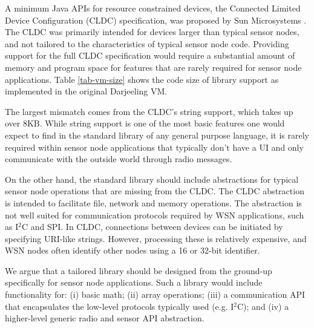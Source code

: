 A minimum Java APIs for resource constrained devices, the Connected Limited Device Configuration (CLDC) specification, was proposed by Sun Microsystems \cite{CLDC}. The CLDC was primarily intended for devices larger than typical sensor nodes, and not tailored to the characteristics of typical sensor node code. Providing support for the full CLDC specification would require a substantial amount of memory and program space for features that are rarely required for sensor node applications. Table \ref{tab-vm-size} shows the code size of library support as implemented in the original Darjeeling VM.

The largest mismatch comes from the CLDC's string support, which takes up over 8KB. While string support is one of the most basic features one would expect to find in the standard library of any general purpose language, it is rarely required within sensor node applications that typically don't have a UI and only communicate with the outside world through radio messages.


On the other hand, the standard library should include abstractions for typical sensor node operations that are missing from the CLDC. The CLDC  abstraction is intended to facilitate file, network and memory operations. The abstraction is not well suited for communication protocols required by WSN applications, such as I$^{2}$C and SPI. In CLDC, connections between devices can be initiated by specifying URI-like strings. However, processing these is relatively expensive, and WSN nodes often identify other nodes using a 16 or 32-bit identifier.


We argue that a tailored library should be designed from the ground-up specifically for sensor node applications. Such a library would include functionality for: (i) basic math; (ii) array operations; (iii) a communication API that encapsulates the low-level protocols typically used (e.g. I$^{2}$C); and (iv) a higher-level generic radio and sensor API abstraction.




